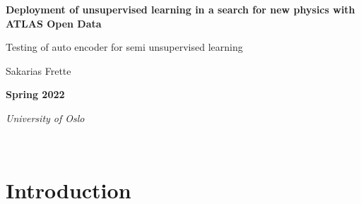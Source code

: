 \documentclass[ reprint, amsmath,amssymb, aps, nofootinbib]{revtex4-2}
\begin{document}
\begin{titlepage}
\centering
\vspace*{2cm}


{\Large\bfseries Deployment of unsupervised learning in a search for new physics with ATLAS Open Data}

\vspace{1cm}
{\Large Testing of auto encoder for semi unsupervised learning}

\vspace{1cm}
{\large Sakarias Frette}

\vspace{1cm}
{\bfseries Spring 2022}
\vspace{0.5cm}

\begin{center}

\begin{abstract}
In this report we implemented an auto encoder using Tensorflow framework for anomaly detection on ATLAS open data. We compare the performance of several models, both using the reconstruction error against the ATLAS open data, and signal Monte Carlo samples with ROC curves. It was showed that using a more complex auto encoder, removing certain low level features, and standard scaling improved the auto encoders ability to filter out certain signals, with a max AUC score of around 0.68. Proposals are put forward to better understand the auto encoder and its use for anomaly detection, one of which is to expand the amount of hyper parameters and the range of them. 
\end{abstract}
\end{center}
\vspace{2.5cm}

{\itshape University of Oslo}
\end{titlepage}
\clearpage
\newpage
\mbox{~}
\clearpage
\newpage

\tableofcontents




\section{Introduction}
\end{document}
